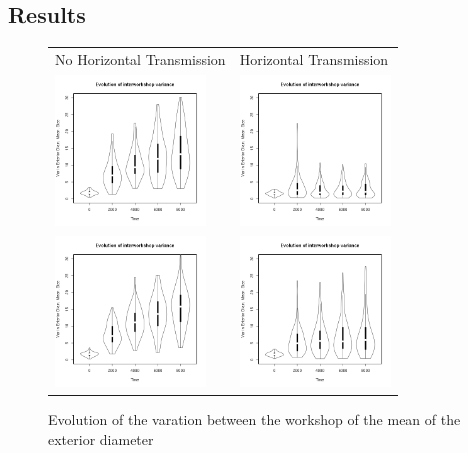 \documentclass[a4paper]{article}
\begin{document}
\subsection{Results}
    \begin{figure}[H!]
	\begin{tabular}{m{4cm}m{4cm}}
	    {\tiny \hspace{.4cm}No Horizontal Transmission} & {\centering\tiny Horizontal Transmission }\\
	    \includegraphics[height=4cm]{images/lineNC.png}
	    &
	    \includegraphics[height=4cm]{images/lineC.png}\\
	    \includegraphics[height=4cm]{images/cubeNC.png}
	    &
	    \includegraphics[height=4cm]{images/cubeC.png}\\
	\end{tabular}
	\caption{Evolution of the varation between the workshop of the mean of the exterior diameter}
    \end{figure}
 
\end{document}
